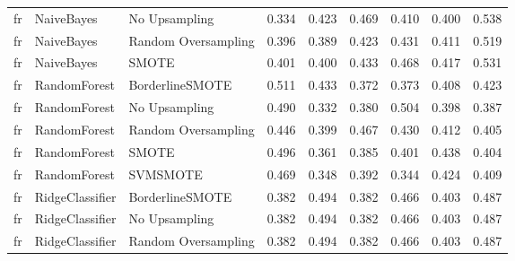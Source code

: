 \begin{tabular}{lllllllll}
      fr &                      NaiveBayes &                 No Upsampling & 0.334 &                     0.423 &                 0.469 &                  0.410 &                                   0.400 &     0.538 \\
      fr &                      NaiveBayes &           Random Oversampling & 0.396 &                     0.389 &                 0.423 &                  0.431 &                                   0.411 &     0.519 \\
      fr &                      NaiveBayes &                         SMOTE & 0.401 &                     0.400 &                 0.433 &                  0.468 &                                   0.417 &     0.531 \\
      fr &                    RandomForest &               BorderlineSMOTE & 0.511 &                     0.433 &                 0.372 &                  0.373 &                                   0.408 &     0.423 \\
      fr &                    RandomForest &                 No Upsampling & 0.490 &                     0.332 &                 0.380 &                  0.504 &                                   0.398 &     0.387 \\
      fr &                    RandomForest &           Random Oversampling & 0.446 &                     0.399 &                 0.467 &                  0.430 &                                   0.412 &     0.405 \\
      fr &                    RandomForest &                         SMOTE & 0.496 &                     0.361 &                 0.385 &                  0.401 &                                   0.438 &     0.404 \\
      fr &                    RandomForest &                      SVMSMOTE & 0.469 &                     0.348 &                 0.392 &                  0.344 &                                   0.424 &     0.409 \\
      fr &                 RidgeClassifier &               BorderlineSMOTE & 0.382 &                     0.494 &                 0.382 &                  0.466 &                                   0.403 &     0.487 \\
      fr &                 RidgeClassifier &                 No Upsampling & 0.382 &                     0.494 &                 0.382 &                  0.466 &                                   0.403 &     0.487 \\
      fr &                 RidgeClassifier &           Random Oversampling & 0.382 &                     0.494 &                 0.382 &                  0.466 &                                   0.403 &     0.487 \\

\end{tabular}
